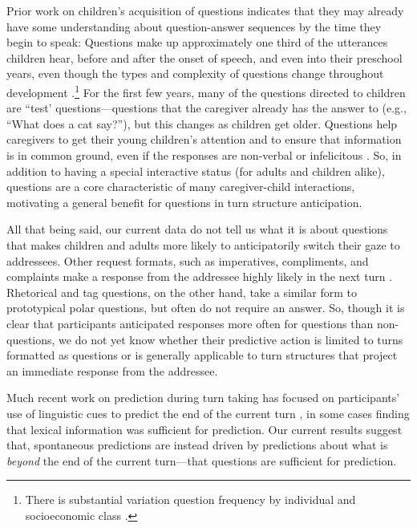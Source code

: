 \documentclass[authoryear, 12pt]{elsarticle}
\begin{document}
Prior work on children's acquisition of questions indicates that they may already have some understanding about question-answer  sequences by the time they begin to speak: Questions make up approximately one third of the utterances children hear, before and after the onset of speech, and even into their preschool years, even though the types and complexity of questions change throughout development \citep{casillas2016, fitneva2012, henning2005, shatz1979}.\footnote{There is substantial variation question frequency by individual and socioeconomic class \citep{hart1992}.} For the first few years, many of the questions directed to children are ``test' questions---questions that the caregiver already has the answer to (e.g., ``What does a cat say?''), but this changes as children get older. Questions help caregivers to get their young children's attention and to ensure that information is in common ground, even if the responses are non-verbal or infelicitous \citep{bruner1985, fitneva2012, snow1977}. So, in addition to having a special interactive status (for adults and children alike), questions are a core characteristic of many caregiver-child interactions, motivating a general benefit for questions in turn structure anticipation.

All that being said, our current data do not tell us what it is about questions that makes children and adults more likely to anticipatorily switch their gaze to addressees. Other request formats, such as imperatives, compliments, and complaints make a response from the addressee highly likely in the next turn \citep{schegloff2007}. Rhetorical and tag questions, on the other hand, take a similar form to prototypical polar questions, but often do not require an answer. So, though it is clear that participants anticipated responses more often for questions than non-questions, we do not yet know whether their predictive action is limited to turns formatted as questions or is generally applicable to turn structures that project an immediate response from the addressee. 

Much recent work on prediction during turn taking has focused on participants' use of linguistic cues to predict the end of the current turn \citep{torreira2015, magyari2012, de-ruiter2006, ford1996, duncan1972}, in some cases finding that lexical information was sufficient for prediction. Our current results suggest that, spontaneous predictions are instead driven by predictions about what is \textit{beyond} the end of the current turn---that questions are sufficient for prediction.
\end{document}
